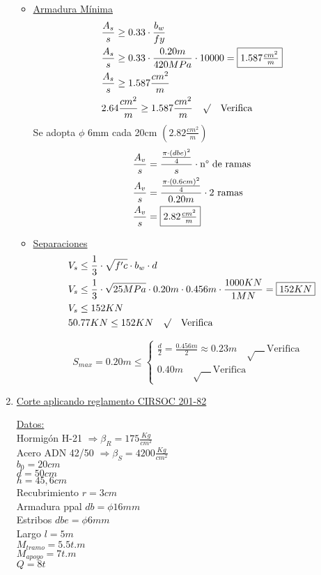 \begin{enumerate}
\begin{itemize}
\item \underline{Armadura Mínima}
\begin{align*}
& \frac{A_s}{s} \geq 0.33 \cdot \frac{b_w}{fy}\\ 
& \frac{A_s}{s} \geq 0.33 \cdot \frac{0.20m}{420MPa} \cdot 10000 = \framebox{$1.587 \frac{cm^2}{m}$}\\
& \frac{A_s}{s} \geq 1.587 \frac{cm^2}{m}\\
& 2.64 \frac{cm^2}{m} \geq 1.587 \frac{cm^2}{m} \quad \surd \quad \text{Verifica}
\end{align*}
Se adopta $\phi$ 6mm cada 20cm $(2.82 \frac{cm^2}{m})$\\
\begin{align*}
& \frac{A_v}{s} = \frac{\frac{\pi \cdot (dbe)^2}{4}}{s}\cdot \text{n° de ramas}\\
& \frac{A_v}{s} = \frac{\frac{\pi \cdot (0.6cm)^2}{4}}{0.20m}\cdot \text{2 ramas}\\
& \frac{A_v}{s} = \framebox{$2.82 \frac{cm^2}{m}$}
\end{align*}

\item \underline{Separaciones}
\begin{align*}
& V_s \leq \frac{1}{3} \cdot \sqrt{f'c} \cdot b_w \cdot d\\
& V_s \leq \frac{1}{3} \cdot \sqrt{25MPa} \cdot 0.20m \cdot 0.456m \cdot \frac{1000KN}{1MN} = \framebox{$152KN$}\\
& V_s \leq 152KN\\
& 50.77KN \leq 152KN \quad \surd \quad \text{Verifica}
\end{align*}

\[ S_{max} = 0.20m \leq \left\{ \begin{array}{ll}
         \frac{d}{2}= \frac{0.456m}{2} \approx 0.23m \quad \surd \quad \text{Verifica} & \\
         0.40m \quad \surd \quad \text{Verifica} & \end{array} \right. \]
\end{itemize}
\newpage
\item \underline{Corte aplicando reglamento CIRSOC 201-82}

\underline{Datos:}\\
Hormigón H-21 $\Rightarrow \beta_R = 175 \frac{Kg}{cm^2}$\\
Acero ADN 42/50 $\Rightarrow \beta_S = 4200 \frac{Kg}{cm^2}$\\
$b_0 = 20cm $\\
$d = 50cm $\\
$h= 45,6cm $\\
Recubrimiento $r = 3cm$\\
Armadura ppal $db = \phi 16mm$\\
Estribos $dbe = \phi 6mm$\\
Largo $l = 5m$\\
$M_{tramo} = 5.5 t.m$\\
$M_{apoyo} = 7 t.m$\\
$Q = 8 t$\\


\end{enumerate}
